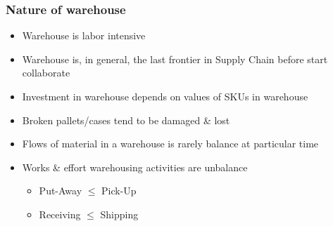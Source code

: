 \documentclass[10pt,handout,notes=show]{beamer}
\begin{document}
  \begin{frame}
  \frametitle{Nature of warehouse}

  \begin{itemize}
    \item Warehouse is \alert{labor intensive}
    \item Warehouse is, in general, the \alert{last frontier} in Supply Chain before start collaborate
    \item Investment in warehouse depends on \alert{values of SKUs} in warehouse
    \item \alert{Broken pallets/cases} tend to be damaged \& lost
    \item Flows of material in a warehouse is \alert{rarely balance} at particular time
    \item Works \& effort warehousing activities are \alert{unbalance}
    \begin{itemize}
      \item<2-> Put-Away $\leq$ Pick-Up
      \item<2-> Receiving $\leq$ Shipping
    \end{itemize}
  \end{itemize}

  \end{frame}
\end{document}
